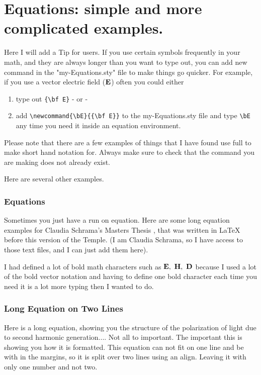 \chapter{Equations: simple and more complicated examples.}

Here I will add a Tip for users. If you use certain symbols frequently in your math, and they are always longer than you want to type out, you can add new command in the "my-Equations.sty" file to make things go quicker. For example, if you use a vector electric field ($\bE$) often you could either

\begin{enumerate}
    \item type out \verb+{\bf E}+ - or - 
    \item add \verb+\newcommand{\bE}{{\bf E}}+ to the my-Equations.sty file and type \verb+\bE+ any time you need it inside an equation environment.
\end{enumerate}
Please note that there are a few examples of things that I have found use full to make short hand notation for. Always make sure to check that the command you are making does not already exist. 


Here are several other examples.

\subsection{Equations}

Sometimes you just have a run on equation. Here are some long equation examples for Claudia Schrama's Masters Thesis \cite{cite-Schrama2018}, that was written in \LaTeX{} before this version of the Temple. (I am Claudia Schrama, so I have access to those text files, and I can just add them here).

I had defined a lot of bold math characters such as $\bE,\ \bH,\ \bD$ because I used a lot of the bold vector notation and having to define one bold character each time you need it is a lot more typing then I wanted to do.

\subsection{Long Equation on Two Lines}
Here is a long equation, showing you the structure of the polarization of light due to second harmonic generation.... Not all to important. The important this is showing you how it is formatted. This equation can not fit on one line and be with in the margins, so it is split over two lines using an align. Leaving it with only one number and not two.

